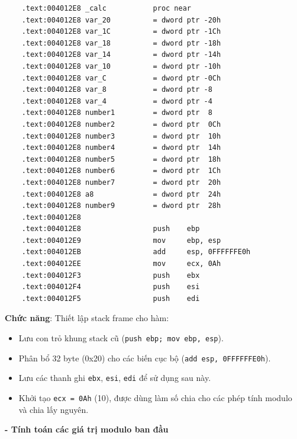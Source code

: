 \begin{lstlisting}
	.text:004012E8 _calc           proc near
	.text:004012E8 var_20          = dword ptr -20h
	.text:004012E8 var_1C          = dword ptr -1Ch
	.text:004012E8 var_18          = dword ptr -18h
	.text:004012E8 var_14          = dword ptr -14h
	.text:004012E8 var_10          = dword ptr -10h
	.text:004012E8 var_C           = dword ptr -0Ch
	.text:004012E8 var_8           = dword ptr -8
	.text:004012E8 var_4           = dword ptr -4
	.text:004012E8 number1         = dword ptr  8
	.text:004012E8 number2         = dword ptr  0Ch
	.text:004012E8 number3         = dword ptr  10h
	.text:004012E8 number4         = dword ptr  14h
	.text:004012E8 number5         = dword ptr  18h
	.text:004012E8 number6         = dword ptr  1Ch
	.text:004012E8 number7         = dword ptr  20h
	.text:004012E8 a8              = dword ptr  24h
	.text:004012E8 number9         = dword ptr  28h
	.text:004012E8
	.text:004012E8                 push    ebp
	.text:004012E9                 mov     ebp, esp
	.text:004012EB                 add     esp, 0FFFFFFE0h
	.text:004012EE                 mov     ecx, 0Ah
	.text:004012F3                 push    ebx
	.text:004012F4                 push    esi
	.text:004012F5                 push    edi
\end{lstlisting}

\textbf{Chức năng}: Thiết lập stack frame cho hàm:
\begin{itemize}
	\item Lưu con trỏ khung stack cũ (\texttt{push ebp; mov ebp, esp}).
	\item Phân bổ 32 byte (0x20) cho các biến cục bộ (\texttt{add esp, 0FFFFFFE0h}).
	\item Lưu các thanh ghi \texttt{ebx}, \texttt{esi}, \texttt{edi} để sử dụng sau này.
	\item Khởi tạo \texttt{ecx = 0Ah} (10), được dùng làm số chia cho các phép tính modulo và chia lấy nguyên.
\end{itemize}

\textbf{- Tính toán các giá trị modulo ban đầu}


